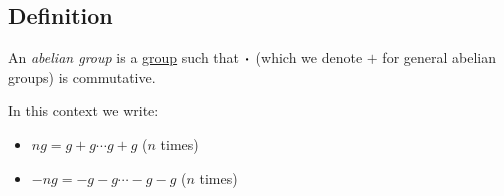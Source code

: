 \subsection{Definition}\label{abeliangroupdefinition}

An \emph{abelian group} is a \hyperref[groupdefinition]{group} such that $\LargerCdot$ (which we denote $+$ for general abelian groups) is commutative.\newline

\noindent In this context we write:
\begin{itemize}
  \item $ng = g + g \cdots g + g$ ($n$ times)
  \item $-ng = - g - g \cdots - g - g$ ($n$ times)
\end{itemize} 